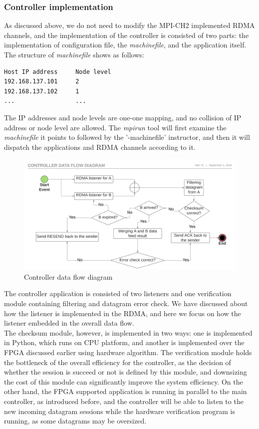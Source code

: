 \documentclass[11pt,openright,a4paper]{report}
\begin{document}
\subsubsection{Controller implementation}
As discussed above, we do not need to modify the MPI-CH2 implemented RDMA channels, and the implementation of the controller is consisted of two parts: the implementation of configuration file, the \textit{machinefile}, and the application itself.\\
The structure of \textit{machinefile} shows as follows:
\begin{lstlisting}[breaklines,breakatwhitespace,caption={Example code},label=Example-Code]
Host IP address		Node level
192.168.137.101		2
192.168.137.102		1
...					...
\end{lstlisting}
The IP addresses and node levels are one-one mapping, and no collision of IP address or node level are allowed. The \textit{mpirun} tool will first examine the \textit{machinefile} it points to followed by  the '-machinefile' instructor, and then it will dispatch the applications and RDMA channels according to it.\\
\begin{figure}[H]
\centering
\includegraphics[width=1.0\linewidth]{"picture/Controller data flow diagram - Page 1"}
\caption{Controller data flow diagram}
\label{fig:Controllerdataflowdiagram-Page1}
\end{figure}
The controller application is consisted of two listeners and one verification module containing filtering and datagram error check. We have discussed about how the listener is implemented in the RDMA, and here we focus on how the listener embedded in the overall data flow.\\
The checksum module, however, is implemented in two ways: one is implemented in Python, which runs on CPU platform, and another is implemented over the FPGA discussed earlier using hardware algorithm. The verification module holds the bottleneck of the overall efficiency for the controller, as the decision of whether the session is succeed or not is defined by this module, and downsizing the cost of this module can significantly improve the system efficiency. On the other hand, the FPGA supported application is running in parallel to the main controller, as introduced before, and the controller will be able to listen to the new incoming datagram sessions while the hardware verification program is running, as some datagrams may be oversized.\\
\end{document}
